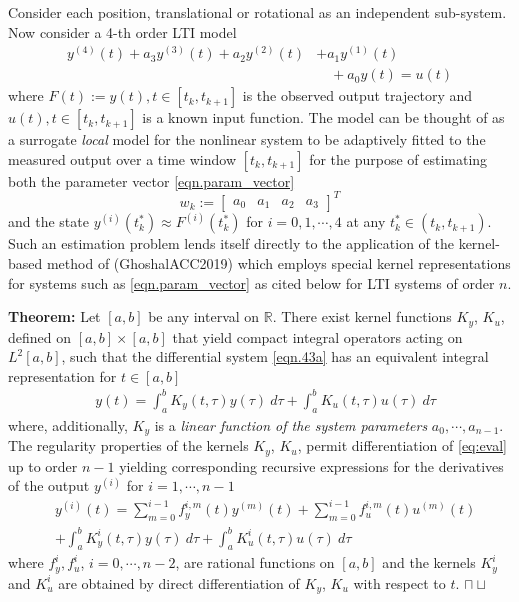 \documentclass{article}
\newtheorem{theorem}{Theorem}
\newcommand{\eop}{\hfill $\sqcap\!\!\!\!\sqcup$} %
\begin{document}
Consider each position, translational or rotational as an independent sub-system. Now consider a 4-th order LTI model
\begin{equation}\label{eqn.LTI_model}	
\begin{split}
	y^{(4)}(t) + a_{3}y^{(3)}(t) + a_{2} y^{(2)}(t) &+ a_{1}y^{(1)}(t)\\
	&\quad + a_{0}y(t) = u(t)
\end{split}
\end{equation}
where  $F(t) := y(t), t \in [t_k,t_{k+1}]$ is the observed output trajectory and $u(t), t \in [t_k,t_{k+1}]$ is a known
input function.  The model can be thought of as a surrogate {\it local} model for the nonlinear system to be adaptively fitted to the measured output over a time window $[t_k,t_{k+1}]$ for the purpose of estimating both the parameter vector \eqref{eqn.param_vector}
\begin{equation}\label{eqn.param_vector}
w_k:=\begin{bmatrix}a_0& a_1& a_2&a_3\end{bmatrix}^T
\end{equation}
and the state $y^{(i)}(t^*_k) \approx F^{(i)}(t^*_k)$ for $i=0, 1, \cdots , 4$ at any
$t^*_k  \in (t_{k},t_{k+1})$. Such an estimation problem lends itself directly to the application of the kernel-based method of (GhoshalACC2019) which employs special kernel representations for systems such as \eqref{eqn.param_vector} as cited below for LTI systems of order $n$.

\textbf{Theorem:} Let $[a,b]$ be any interval on $\mathbb{R}$. There exist kernel functions $K_{y}$,  $K_{u}$,  defined on $[a,b] \times [a,b]$ that yield compact 
integral operators acting on $L^2[a,b]$, such that the differential system \eqref{eqn.43a}	has an equivalent integral representation for $t \in [a,b]$
\begin{align}
& y(t) = \int_a^b K_{y}(t,\tau) y(\tau) \ d \tau + \int_a^b K_{u}(t,\tau) u(\tau) \ d \tau \label{eq:eval}
\end{align}
where, additionally, $K_{y}$ is a {\it linear function of the system parameters} $a_0, \cdots , a_{n-1}$.
The regularity properties of the kernels  $K_{y}$,  $K_{u}$, permit differentiation of \eqref{eq:eval} up to order $n-1$ yielding corresponding recursive expressions for the derivatives of the output $y^{(i)}$ for $ i=1, \cdots , n-1$ 
\begin{align}
& y^{(i)}(t) = \sum_{m=0}^{i-1} f_y^{i,m}(t) y^{(m)}(t) + \sum_{m=0}^{i-1} f_u^{i,m}(t) u^{(m)}(t) \nonumber \\
& + \int_a^b K_{y}^{i} (t,\tau) y(\tau) \ d \tau + \int_a^b K_{u}^{i} (t,\tau) u(\tau) \ d \tau  \label{eq:evalD}
\end{align}
where
$f_y^i, f_u^i$, $i=0, \cdots , n-2$, are rational functions on $[a,b]$ and the kernels $K_{y}^{i}$ and
$K_{u}^{i}$ are obtained by direct differentiation of $K_{y}$,  $K_{u}$ with respect to $t$. \hspace*{0pt}\hfill \eop
\end{document}
